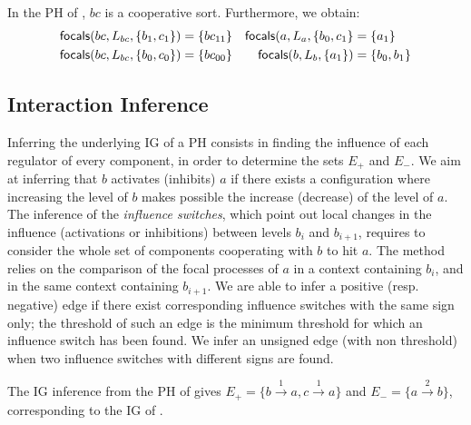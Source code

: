 \begin{example*}
In the PH of , $bc$ is a cooperative sort. Furthermore, we obtain:
\begin{align*}
\mathsf{focals}(bc, L_{bc}, \{b_1, c_1\}) &= \{bc_{11}\} & \mathsf{focals}(a, L_a, \{b_0, c_1\} &= \{a_1\} \\
\mathsf{focals}(bc, L_{bc}, \{b_0, c_0\}) &= \{bc_{00}\} & \mathsf{focals}(b, L_b, \{a_1\}) &= \{b_0, b_1\}
\end{align*}
\end{example*}

\begin{comment}
\begin{example*}
In the PH of \pref{fig:runningPH}, $bc$ is a well-formed cooperative sort, because:
\begin{align*}
\focals(bc, \PHl_{bc}, \{b_0, c_0\} \cup \PHl_{bc}) = \{bc_{00}\} && \focals(bc, \PHl_{bc}, \{b_0, c_1\} \cup \PHl_{bc}) = \{bc_{01}\} \\
\focals(bc, \PHl_{bc}, \{b_1, c_0\} \cup \PHl_{bc}) = \{bc_{10}\} && \focals(bc, \PHl_{bc}, \{b_1, c_1\} \cup \PHl_{bc}) = \{bc_{11}\}
\end{align*}
Hence, this PH is well-formed for IG inference, and $a$, $b$ and $c$ are the components.
\end{example*}
\end{comment}



\subsection{Interaction Inference}\label{ssec:infer-IG}

Inferring the underlying IG of a PH consists in finding the influence of each regulator of every component, in order to determine the sets $E_+$ and $E_-$.
We aim at inferring that $b$ activates (inhibits) $a$ if there exists a configuration where increasing the level of $b$ makes possible the increase (decrease) of the level of $a$.
The inference of the \emph{influence switches}, which point out local changes in the influence (activations or inhibitions) between levels $b_i$ and $b_{i+1}$, requires to consider the whole set of components cooperating with $b$ to hit $a$.
The method relies on the comparison of the focal processes of $a$ in a context containing $b_i$, and in the same context containing $b_{i+1}$.
We are able to infer a positive (resp. negative) edge if there exist corresponding influence switches with the same sign only; the threshold of such an edge is the minimum threshold for which an influence switch has been found.
We infer an unsigned edge (with non threshold) when two influence switches with different signs are found.

\begin{example*}
The IG inference from the PH of  gives
$E_+ = \{b \xrightarrow{1} a, c \xrightarrow{1} a\}$ and
$E_- = \{a \xrightarrow{2} b\}$, corresponding to the IG of .
\end{example*}
